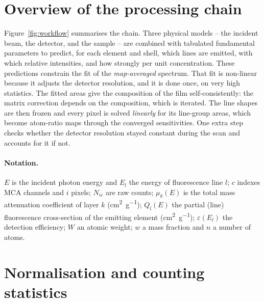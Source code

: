 \documentclass[11pt,a4paper]{article}
\begin{document}
\section{Overview of the processing chain}\label{sec:overview}
Figure~\ref{fig:workflow} summarises the chain. Three physical models -- the incident beam, the
detector, and the sample -- are combined with tabulated fundamental parameters to predict, for each
element and shell, which lines are emitted, with which relative intensities, and how strongly per unit
concentration. These predictions constrain the fit of the \emph{map-averaged} spectrum. That fit is
non-linear because it adjusts the detector resolution, and it is done once, on very high statistics.
The fitted areas give the composition of the film self-consistently: the matrix correction depends on
the composition, which is iterated. The line shapes are then frozen and every pixel is solved
\emph{linearly} for its line-group areas, which become atom-ratio maps through the converged
sensitivities. One extra step checks whether the detector resolution stayed constant during the scan
and accounts for it if not.


\paragraph{Notation.} $E$ is the incident photon energy and $E_l$ the energy of fluorescence line $l$;
$c$ indexes MCA channels and $i$ pixels; $N_{ic}$ are raw counts; $\mu_k(E)$ is the total mass
attenuation coefficient of layer $k$ (\unit{cm^2.g^{-1}}); $Q_{l}(E)$ the partial (line) fluorescence
cross-section of the emitting element (\unit{cm^2.g^{-1}}); $\varepsilon(E_l)$ the detection
efficiency; $W$ an atomic weight; $w$ a mass fraction and $n$ a number of atoms.

\section{Normalisation and counting statistics}\label{sec:norm}
\end{document}
